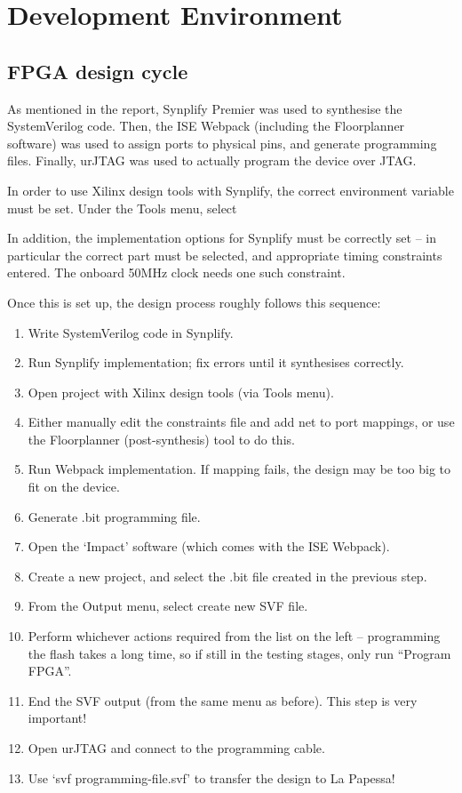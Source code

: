 \chapter{Development Environment} %
\label{apdx:development_environment}


\section{FPGA design cycle} %
\label{apdx:fpga_design_cycle}
	As mentioned in the report, Synplify Premier was used to synthesise the SystemVerilog code.  Then, the ISE Webpack (including the Floorplanner software) was used to assign ports to physical pins, and generate programming files.  Finally, urJTAG was used to actually program the device over JTAG.

	In order to use Xilinx design tools with Synplify, the correct environment variable must be set.  Under the Tools menu, select %

	In addition, the implementation options for Synplify must be correctly set -- in particular the correct part must be selected, and appropriate timing constraints entered.  The onboard 50MHz clock needs one such constraint.

	Once this is set up, the design process roughly follows this sequence:
	\begin{enumerate}
		\item Write SystemVerilog code in Synplify.
		\item Run Synplify implementation; fix errors until it synthesises correctly.
		\item Open project with Xilinx design tools (via Tools menu).
		\item Either manually edit the constraints file and add net to port mappings, or use the Floorplanner (post-synthesis) tool to do this.
		\item Run Webpack implementation.  If mapping fails, the design may be too big to fit on the device.
		\item Generate .bit programming file.
		\item Open the `Impact' software (which comes with the ISE Webpack).
		\item Create a new project, and select the .bit file created in the previous step.
		\item From the Output menu, select create new SVF file.
		\item Perform whichever actions required from the list on the left -- programming the flash takes a long time, so if still in the testing stages, only run ``Program FPGA''.
		\item End the SVF output (from the same menu as before).  This step is very important!
		\item Open urJTAG and connect to the programming cable.
		\item Use `svf programming-file.svf' to transfer the design to La Papessa!
	\end{enumerate}

